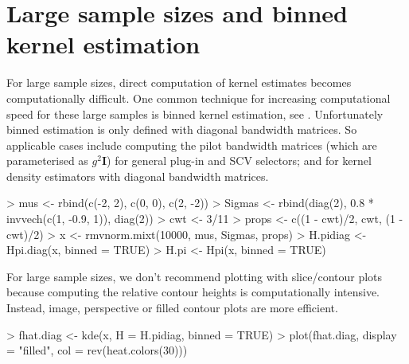 \documentclass[a4paper,11pt]{article}
\newcommand{\mat}[1]{\mathbf{#1}}
\begin{document}
\section{Large sample sizes and binned kernel estimation}
\label{sec:binned}

For large sample sizes, direct computation of kernel estimates becomes 
computationally difficult. One common technique for increasing computational
speed for these large samples is binned kernel estimation, 
see \citet*[Appendix~D]{wand94}. Unfortunately binned estimation is only defined 
with diagonal bandwidth matrices. So applicable cases include 
computing the pilot bandwidth matrices
(which are parameterised as $g^2 \mat{I}$) for general plug-in and SCV selectors;
and for kernel density estimators with diagonal bandwidth matrices. 


\begin{Schunk}
\begin{Sinput}
> mus <- rbind(c(-2, 2), c(0, 0), c(2, -2))
> Sigmas <- rbind(diag(2), 0.8 * invvech(c(1, -0.9, 1)), diag(2))
> cwt <- 3/11
> props <- c((1 - cwt)/2, cwt, (1 - cwt)/2)
> x <- rmvnorm.mixt(10000, mus, Sigmas, props)
> H.pidiag <- Hpi.diag(x, binned = TRUE)
> H.pi <- Hpi(x, binned = TRUE)
\end{Sinput}
\end{Schunk}
For large sample sizes, we don't recommend plotting with slice/contour plots
because computing the relative contour heights is computationally intensive.
Instead, image, perspective or filled contour plots are more efficient.
\begin{Schunk}
\begin{Sinput}
> fhat.diag <- kde(x, H = H.pidiag, binned = TRUE)
> plot(fhat.diag, display = "filled", col = rev(heat.colors(30)))
\end{Sinput}
\end{Schunk}
\end{document}
